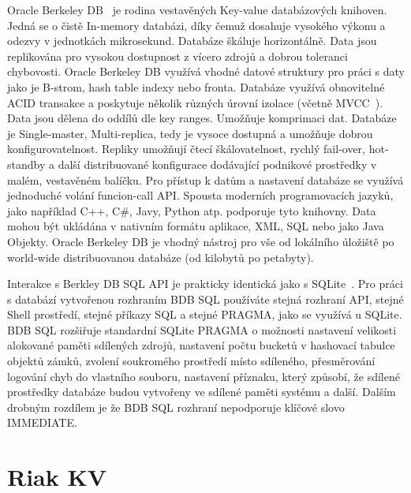 \documentclass[czech,master,dept460,male,csharp,cpdeclaration]{diploma}
\begin{document}
	Oracle Berkeley DB~\cite{berkeleydb} je rodina vestavěných Key-value databázových knihoven. Jedná se o čistě In-memory databázi, díky čemuž dosahuje vysokého výkonu a odezvy v jednotkách mikrosekund. Databáze škáluje horizontálně. Data jsou replikována pro vysokou dostupnost z vícero zdrojů a dobrou toleranci chybovosti. Oracle Berkeley DB využívá vhodné datové struktury pro práci s daty jako je B-strom, hash table indexy nebo fronta. Databáze využívá obnovitelné ACID transakce a poskytuje několik různých úrovní izolace (včetně MVCC~\cite{mvcc}). Data jsou dělena do oddílů dle key ranges. Umožňuje komprimaci dat. Databáze je Single-master, Multi-replica, tedy je vysoce dostupná a umožňuje dobrou konfigurovatelnost. Repliky umožňují čtecí škálovatelnost, rychlý fail-over, hot-standby a další distribuované konfigurace dodávající podnikové prostředky v malém, vestavěném balíčku. Pro přístup k datům a nastavení databáze se využívá jednoduché volání funcion-call API. Spousta moderních programovacích jazyků, jako například C++, C\#, Javy, Python atp. podporuje tyto knihovny. Data mohou být ukládána v nativním formátu aplikace, XML, SQL nebo jako Java Objekty. Oracle Berkeley DB je vhodný nástroj pro vše od lokálního úložiště po world-wide distribuovanou databáze (od kilobytů po petabyty).
	
	Interakce s Berkley DB SQL API je prakticky identická jako s SQLite~\cite{sqlite}. Pro práci s databází vytvořenou rozhraním BDB SQL používáte stejná rozhraní API, stejné Shell prostředí, stejné příkazy SQL a stejné PRAGMA, jako se využívá u SQLite. BDB SQL rozšiřuje standardní SQLite PRAGMA o možnosti nastavení velikosti alokované paměti sdílených zdrojů, nastavení počtu bucketů v hashovací tabulce objektů zámků, zvolení soukromého prostředí místo sdíleného, přesměrování logování chyb do vlastního souboru, nastavení příznaku, který způsobí, že sdílené prostředky databáze budou vytvořeny ve sdílené paměti systému a další. Dalším drobným rozdílem je že BDB SQL rozhraní nepodporuje klíčové slovo IMMEDIATE.
	
	\section{Riak KV}
	
\end{document}
